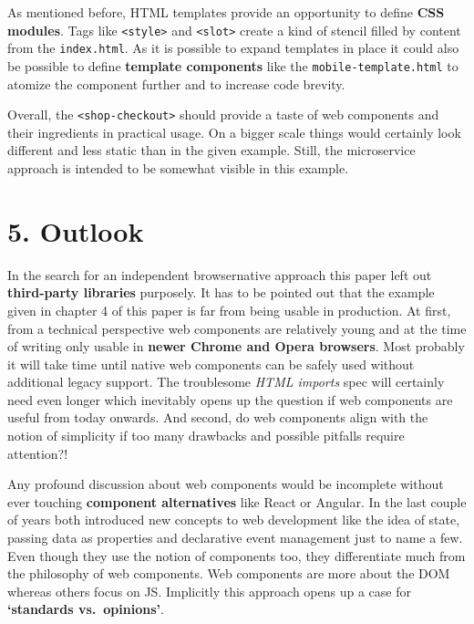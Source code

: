 \documentclass[]{article}
\begin{document}
As mentioned before, HTML templates provide an opportunity to define
\textbf{CSS modules}. Tags like \texttt{\textless{}style\textgreater{}}
and \texttt{\textless{}slot\textgreater{}} create a kind of stencil
filled by content from the \texttt{index.html}. As it is possible to
expand templates in place it could also be possible to define
\textbf{template components} like the \texttt{mobile-template.html} to
atomize the component further and to increase code brevity.

Overall, the \texttt{\textless{}shop-checkout\textgreater{}} should
provide a taste of web components and their ingredients in practical
usage. On a bigger scale things would certainly look different and less
static than in the given example. Still, the microservice approach is
intended to be somewhat visible in this example.

\section{5. Outlook}\label{outlook}

In the search for an independent browsernative approach this paper left
out \textbf{third-party libraries} purposely. It has to be pointed out
that the example given in chapter 4 of this paper is far from being
usable in production. At first, from a technical perspective web
components are relatively young and at the time of writing only usable
in \textbf{newer Chrome and Opera browsers}. Most probably it will take
time until native web components can be safely used without additional
legacy support. The troublesome \emph{HTML imports} spec will certainly
need even longer which inevitably opens up the question if web
components are useful from today onwards. And second, do web components
align with the notion of simplicity if too many drawbacks and possible
pitfalls require attention?!

Any profound discussion about web components would be incomplete without
ever touching \textbf{component alternatives} like React or Angular. In
the last couple of years both introduced new concepts to web development
like the idea of state, passing data as properties and declarative event
management just to name a few. Even though they use the notion of
components too, they differentiate much from the philosophy of web
components. Web components are more about the DOM whereas others focus
on JS. Implicitly this approach opens up a case for \textbf{`standards
vs.~opinions'}.
\end{document}
